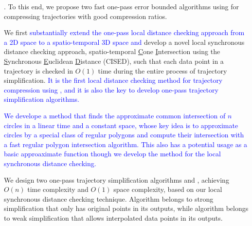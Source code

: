 . To this end, we propose two fast one-pass error bounded \lsa algorithms using \sed for compressing trajectories with good compression ratios. %

 We first \textcolor{blue}{substantially extend the one-pass local distance checking approach from a 2D space to a spatio-temporal 3D space and} develop a novel local synchronous distance checking approach, \ie spatio-temporal \underline{C}one \underline{I}ntersection using the \underline{S}ynchronous \underline{E}uclidean \underline{D}istance (CISED), such that each data point in a trajectory is checked in $O(1)$ time during the entire process of trajectory simplification.
\textcolor{blue}{It is the first local distance checking method for trajectory compression using \sed, and it is also the key to develop one-pass trajectory simplification algorithms.}



 \textcolor{blue}{We develope a method that finds the approximate common intersection of $n$ circles in a linear time and a constant space, whose key idea is to approximate circles by a special class of regular polygons and compute their intersection with a fast regular polygon intersection algorithm. This also has a potential usage as a basic approaximate function though we develop the method for the local synchronous distance checking.}



 We design two one-pass trajectory simplification algorithms \cist and \cista, achieving $O(n)$ time complexity and $O(1)$ space complexity, based on our local synchronous distance checking technique.
Algorithm \cist belongs to strong simplification that only has original points in its outputs, while algorithm \cista belongs to weak simplification that allows interpolated data points in its outputs.


